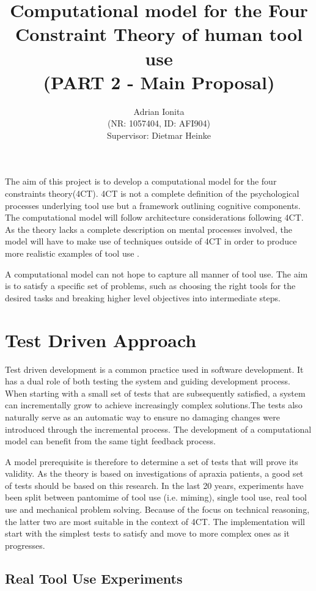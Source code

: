 \documentclass[11]{article}
\title{
  Computational model for the Four Constraint Theory of human tool use\\  
  \setlength{\parskip}{0.5em}  
  \normalsize (PART 2 - Main Proposal)
  }
\date{}
\author{Adrian Ionita\\
\small{(NR: 1057404, ID: AFI904)}\\
Supervisor: Dietmar Heinke}
\begin{document}
\maketitle 	

The aim of this project is to develop a computational model for the four constraints theory(4CT).
4CT is not a complete definition of the psychological processes underlying tool use but a framework outlining cognitive components.   
The computational model will follow architecture considerations following 4CT.  As the theory lacks a complete description on mental processes involved, the model will have to make use of techniques outside of 4CT in order to produce more realistic examples of tool use . 

A computational model can not hope to capture all manner of tool use. The aim is to satisfy a specific set of problems, such as choosing the right tools for the desired tasks and breaking higher level objectives into intermediate steps.

\section{Test Driven Approach}

Test driven development is a common practice used in software development\cite{janzen2005}\cite{ibm2003}. It has a dual role of both testing the system and guiding development process\cite{janzen2005architecture}. When starting with a small set of tests that are subsequently satisfied, a system can incrementally grow to achieve increasingly complex solutions.The tests also naturally serve as an automatic way to ensure no damaging changes were introduced through the incremental process. The development of a computational model can benefit from the same tight feedback process.

A model prerequisite is therefore to determine a set of tests that will prove its validity. As the theory is based on investigations of apraxia patients, a good set of tests should be based on this research. In the last 20 years, experiments have been split between pantomime of tool use (i.e. miming), single tool use, real tool use and mechanical problem solving\cite{baumard2014}. Because of the focus on technical reasoning, the latter two are most suitable in the context of 4CT. The implementation will start with the simplest tests to satisfy and move to more complex ones as it progresses.

\subsection{Real Tool Use Experiments}
\end{document}
